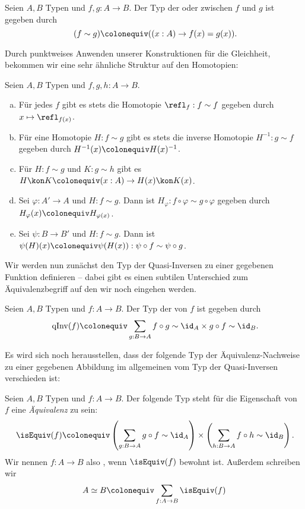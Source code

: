 \begin{definition}
  Seien $A,B$ Typen und $f,g:A\to B$.
  Der Typ der 
  oder  zwischen $f$ und $g$
  ist gegeben durch
  \[
    (f\sim g)\colonequiv( (x:A)\to f(x)=g(x))\rlap{.}
  \]
\end{definition}

Durch punktweises Anwenden unserer Konstruktionen für die Gleichheit,
bekommen wir eine sehr ähnliche Struktur auf den Homotopien:

\begin{definition}
  Seien $A,B$ Typen und $f,g,h:A\to B$.
  \begin{enumerate}[(a)]
  \item Für jedes $f$ gibt es stets die Homotopie $\refl_f:f\sim f$ gegeben durch $x\mapsto \refl_{f(x)}$.
  \item Für eine Homotopie $H:f\sim g$ gibt es stets die inverse Homotopie $H^{-1}:g\sim f$ gegeben durch $H^{-1}(x)\colonequiv H(x)^{-1}$.
  \item Für $H:f\sim g$ und $K:g\sim h$ gibt es $H\kon K\colonequiv (x:A)\to H(x)\kon K(x)$.
  \item Sei $\varphi:A'\to A$ und $H:f\sim g$.
    Dann ist $H_\varphi:f\circ \varphi \sim g\circ \varphi$ gegeben durch $H_\varphi(x)\colonequiv H_{\varphi(x)}$.
  \item Sei $\psi:B\to B'$ und $H:f\sim g$. Dann ist $\psi(H)(x)\colonequiv \psi(H(x)):\psi\circ f\sim\psi\circ g$.
  \end{enumerate}
\end{definition}

Wir werden nun zunächst den Typ der Quasi-Inversen zu einer gegebenen Funktion definieren
-- dabei gibt es einen subtilen Unterschied zum Äquivalenzbegriff auf den wir noch eingehen werden.

\begin{definition}
  Seien $A,B$ Typen und $f:A\to B$. Der Typ der  von $f$ ist gegeben durch
  \[
    \mathrm{qInv}(f)\colonequiv \sum_{g:B\to A} f\circ g\sim \id_A\times g\circ f\sim \id_B\rlap{.}
  \]
\end{definition}

Es wird sich noch herausstellen, dass der folgende Typ der Äquivalenz-Nachweise zu einer gegebenen Abbildung im allgemeinen vom Typ der Quasi-Inversen verschieden ist:

\begin{definition}
  Seien $A,B$ Typen und $f:A\to B$. Der folgende Typ steht für die Eigenschaft von $f$ eine \emph{Äquivalenz} zu sein:
  \[
    \isEquiv(f) \colonequiv \left(\sum_{g:B\to A} g\circ f\sim\id_A \right)\times \left(\sum_{h:B\to A} f\circ h\sim\id_B\right)\rlap{.}
    \]
    Wir nennen $f:A\to B$ also , wenn $\isEquiv(f)$ bewohnt ist.
    Außerdem schreiben wir
    \[
      A\simeq B\colonequiv \sum_{f:A\to B}\isEquiv(f)
    \]
\end{definition}

